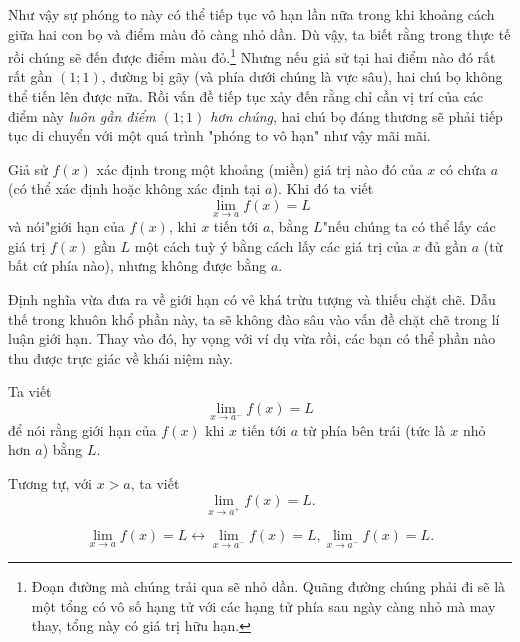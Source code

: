 Như vậy sự phóng to này có thể tiếp tục vô hạn lần nữa trong khi khoảng cách giữa hai con bọ và điểm màu đỏ càng nhỏ dần. Dù vậy, ta biết rằng trong thực tế rồi chúng sẽ đến được điểm màu đỏ.\footnote{Đoạn đường mà chúng trải qua sẽ nhỏ dần. Quãng đường chúng phải đi sẽ là một tổng có vô số hạng tử với các hạng tử phía sau ngày càng nhỏ mà may thay, tổng này có giá trị hữu hạn. }\newline
Nhưng nếu giả sử tại hai điểm nào đó rất rất gần $(1;1)$, đường bị gãy (và phía dưới chúng là vực sâu), hai chú bọ không thể tiến lên được nữa. Rồi vấn đề tiếp tục xảy đến rằng chỉ cần vị trí của các điểm này \emph{luôn gần điểm $(1;1)$ hơn chúng}, hai chú bọ đáng thương sẽ phải tiếp tục di chuyển với một quá trình "phóng to vô hạn" như vậy mãi mãi.

\begin{definition}
    Giả sử $f(x)$ xác định trong một khoảng (miền) giá trị nào đó của $x$ có chứa $a$ (có thể xác định hoặc không xác định tại $a$). Khi đó ta viết
    \begin{equation*}\lim_{x\rightarrow a}f(x)=L\end{equation*}
và nói\qquad\qquad\qquad "giới hạn của $f(x)$, khi $x$ tiến tới $a$, bằng $L$"\newline nếu chúng ta có thể lấy các giá trị $f(x)$ gần $L$ một cách tuỳ ý bằng cách lấy các giá trị của $x$ đủ gần $a$ (từ bất cứ phía nào), nhưng không được bằng $a$.
\end{definition}

Định nghĩa vừa đưa ra về giới hạn có vẻ khá trừu tượng và thiếu chặt chẽ. Dẫu thế trong khuôn khổ phần này, ta sẽ không đào sâu vào vấn đề chặt chẽ trong lí luận giới hạn. Thay vào đó, hy vọng với ví dụ vừa rồi, các bạn có thể phần nào thu được trực giác về khái niệm này.\newline

\begin{definition}
    Ta viết \begin{equation*}\lim_{x\rightarrow a^-}f(x)=L\end{equation*}
để nói rằng giới hạn của $f(x)$ khi $x$ tiến tới $a$ từ phía bên trái (tức là $x$ nhỏ hơn $a$) bằng $L$. 
\end{definition}

Tương tự, với $x>a$, ta viết $$\lim_{x\rightarrow a^+}f(x)=L .$$ 
\begin{theorem}
    \begin{equation*}\lim_{x\rightarrow a}f(x)=L \leftrightarrow \lim_{x\rightarrow a^-}f(x)=L, \lim_{x\rightarrow a^-}f(x)=L.\end{equation*}   
\end{theorem}

